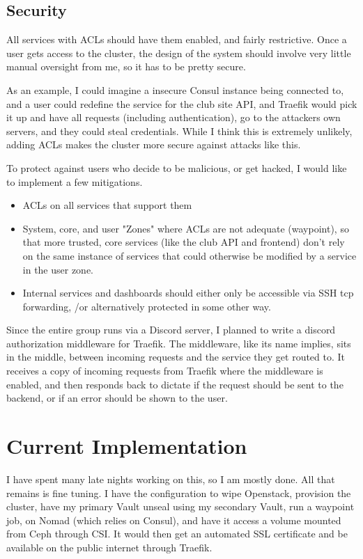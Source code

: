 \documentclass{article}
\begin{document}
\subsection{Security}
All services with ACLs should have them enabled, and fairly restrictive. Once a user gets access to the cluster, the design of the system should involve very little manual oversight from me, so it has to be pretty secure.

As an example, I could imagine a insecure Consul instance being connected to, and a user could redefine the service for the club site API, and Traefik would pick it up and have all requests (including authentication), go to the attackers own servers, and they could steal credentials. While I think this is extremely unlikely, adding ACLs makes the cluster more secure against attacks like this.

To protect against users who decide to be malicious, or get hacked, I would like to implement a few mitigations.
\begin{itemize}
    \item ACLs on all services that support them
    \item System, core, and user "Zones" where ACLs are not adequate (waypoint), so that more trusted, core services (like the club API and frontend) don't rely on the same instance of services that could otherwise be modified by a service in the user zone.
    \item Internal services and dashboards should either only be accessible via SSH tcp forwarding, /or alternatively protected in some other way.
\end{itemize}
Since the entire group runs via a Discord server, I planned to write a discord authorization middleware for Traefik. The middleware, like its name implies, sits in the middle, between incoming requests and the service they get routed to. It receives a copy of incoming requests from Traefik where the middleware is enabled, and then responds back to dictate if the request should be sent to the backend, or if an error should be shown to the user.


\section{Current Implementation}
I have spent many late nights working on this, so I am mostly done. All that remains is fine tuning. I have the configuration to wipe Openstack, provision the cluster, have my primary Vault unseal using my secondary Vault, run a waypoint job, on Nomad (which relies on Consul), and have it access a volume mounted from Ceph through CSI. It would then get an automated SSL certificate and be available on the public internet through Traefik.
\end{document}
